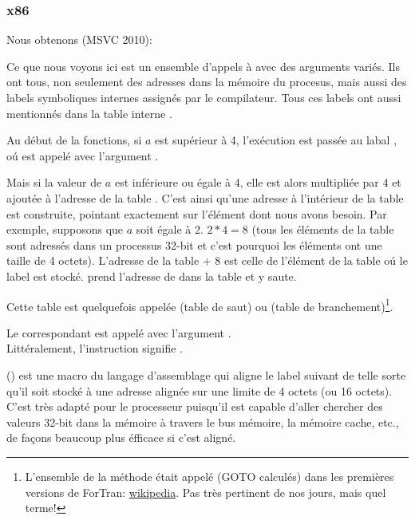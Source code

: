 \subsubsection{x86}


Nous obtenons (MSVC 2010):




Ce que nous voyons ici est un ensemble d'appels à \printf avec des arguments variés.
Ils ont tous, non seulement des adresses dans la mémoire du procesus, mais aussi
des labels symboliques internes assignés par le compilateur.
Tous ces labels ont aussi mentionnés dans la table interne .

Au début de la fonctions, si $a$ est supérieur à 4, l'exécution est passée au
labal , oú \printf est appelé avec l'argument .

Mais si la valeur de $a$ est inférieure ou égale à 4, elle est alors multipliée
par 4 et ajoutée à l'adresse de la table . C'est ainsi qu'une adresse
à l'intérieur de la table est construite, pointant exactement sur l'élément dont
nous avons besoin. Par exemple, supposons que $a$ soit égale à 2. $2*4 = 8$ (tous
les éléments de la table sont adressés dans un processus 32-bit et c'est pourquoi
les éléments ont une taille de 4 octets).
L'adresse de la table  + 8 est celle de l'élément de la table oú
le label  est stocké.
\JMP prend l'adresse de  dans la table et y saute.

Cette table est quelquefois appelée  (table de saut) ou 
(table de branchement)\footnote{L'ensemble de la méthode était appelé  (GOTO calculés) dans les premières versions de ForTran:
\href{http://go.yurichev.com/17122}{wikipedia}.
Pas très pertinent de nos jours, mais quel terme!}.

Le \printf correspondant est appelé avec l'argument .\\
Littéralement, l'instruction  signifie
 .

 () est une macro du langage d'assemblage qui aligne le
label suivant de telle sorte qu'il soit stocké à une adresse alignée sur une limite
de 4 octets (ou 16 octets).
C'est très adapté pour le processeur puisqu'il est capable d'aller chercher des
valeurs 32-bit dans la mémoire à travers le bus mémoire, la mémoire cache, etc.,
de façons beaucoup plus éfficace si c'est aligné.

